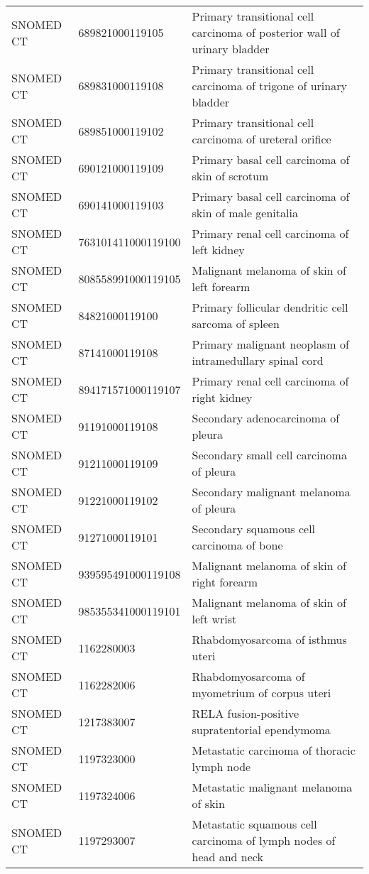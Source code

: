 \begin{longtable}{p{}p{}p{}}
  SNOMED CT & 689821000119105 & Primary transitional cell carcinoma of posterior wall of urinary bladder \\ 
  SNOMED CT & 689831000119108 & Primary transitional cell carcinoma of trigone of urinary bladder \\ 
  SNOMED CT & 689851000119102 & Primary transitional cell carcinoma of ureteral orifice \\ 
  SNOMED CT & 690121000119109 & Primary basal cell carcinoma of skin of scrotum \\ 
  SNOMED CT & 690141000119103 & Primary basal cell carcinoma of skin of male genitalia \\ 
  SNOMED CT & 763101411000119100 & Primary renal cell carcinoma of left kidney \\ 
  SNOMED CT & 808558991000119105 & Malignant melanoma of skin of left forearm \\ 
  SNOMED CT & 84821000119100 & Primary follicular dendritic cell sarcoma of spleen \\ 
  SNOMED CT & 87141000119108 & Primary malignant neoplasm of intramedullary spinal cord \\ 
  SNOMED CT & 894171571000119107 & Primary renal cell carcinoma of right kidney \\ 
  SNOMED CT & 91191000119108 & Secondary adenocarcinoma of pleura \\ 
  SNOMED CT & 91211000119109 & Secondary small cell carcinoma of pleura \\ 
  SNOMED CT & 91221000119102 & Secondary malignant melanoma of pleura \\ 
  SNOMED CT & 91271000119101 & Secondary squamous cell carcinoma of bone \\ 
  SNOMED CT & 939595491000119108 & Malignant melanoma of skin of right forearm \\ 
  SNOMED CT & 985355341000119101 & Malignant melanoma of skin of left wrist \\ 
  SNOMED CT & 1162280003 & Rhabdomyosarcoma of isthmus uteri \\ 
  SNOMED CT & 1162282006 & Rhabdomyosarcoma of myometrium of corpus uteri \\ 
  SNOMED CT & 1217383007 & RELA fusion-positive supratentorial ependymoma \\ 
  SNOMED CT & 1197323000 & Metastatic carcinoma of thoracic lymph node \\ 
  SNOMED CT & 1197324006 & Metastatic malignant melanoma of skin \\ 
  SNOMED CT & 1197293007 & Metastatic squamous cell carcinoma of lymph nodes of head and neck \\ 

\end{longtable}
